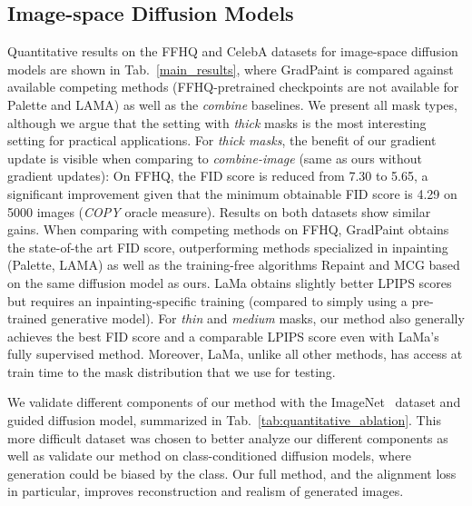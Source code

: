 \subsection{Image-space Diffusion Models}

Quantitative results on the FFHQ and CelebA datasets for image-space diffusion models are shown in Tab.~\ref{main_results}, 
where GradPaint is compared against 
available competing methods (FFHQ-pretrained checkpoints are not available for Palette and LAMA) as well as the \textit{combine} 
baselines. We present all mask types, although we argue that the setting with \emph{thick} masks is the most interesting 
setting for practical applications. For \emph{thick masks},
the benefit of our gradient update is visible when comparing to \textit{combine-image}
(same as ours without gradient updates): On FFHQ, the FID score is reduced from 7.30 to 5.65, a significant improvement given that 
the minimum obtainable FID score is 4.29 on 5000 images (\textit{COPY} oracle measure). Results on both datasets show similar gains. 
When comparing with competing methods on FFHQ, GradPaint obtains the state-of-the art FID score, outperforming methods specialized in 
inpainting (Palette, LAMA) as well as the training-free algorithms Repaint and MCG based on the same diffusion model as ours. LaMa 
obtains slightly better LPIPS scores but requires an inpainting-specific training (compared to simply using a pre-trained generative 
model). For \emph{thin} and \emph{medium} masks, our method also  generally achieves the best FID score 
and a comparable LPIPS score even with LaMa's fully supervised method. Moreover, LaMa, unlike all other methods, 
has access at train time to the mask distribution that we use for testing.  



We validate different components of our method with the ImageNet~\citep{deng2009imagenet} dataset and  guided diffusion model, summarized in 
Tab.~\ref{tab:quantitative_ablation}. This more difficult dataset was chosen to better analyze our different components as well as 
validate our method on class-conditioned diffusion models, where generation could be biased by the class. Our full method, and the 
alignment loss in particular, improves reconstruction and realism of generated images.




